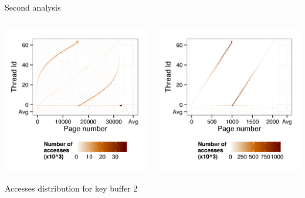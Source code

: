 \documentclass[xcolor={usenames,dvipsnames},hyperref={pdfusetitle}]{beamer}
\begin{document}
\begin{frame}{Second analysis}
    \begin{columns}
        \begin{column}{.45\linewidth}
            \includegraphics[width=\linewidth]  {tabarnac/is_b_kb2_modif}
            \begin{block}{}
                \centering
                Accesses distribution for key buffer 2
            \end{block}
        \end{column}
        \begin{column}{.45\linewidth}
            \includegraphics[width=\linewidth]  {tabarnac/is_b_kb1_modif}

\end{column}
\end{columns}
\end{frame}
\end{document}
